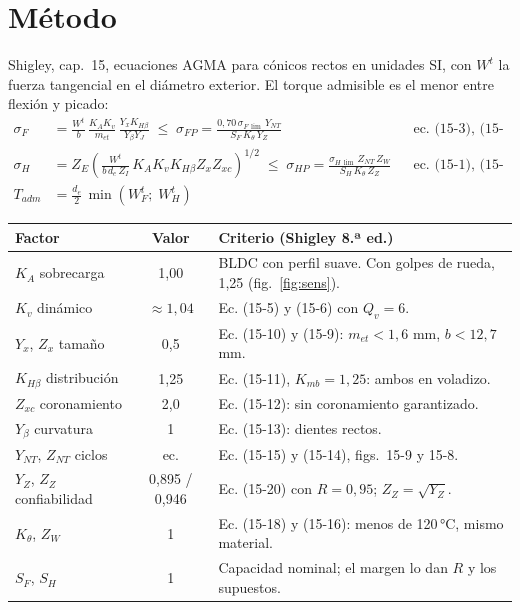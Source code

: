 \documentclass[11pt,a4paper]{article}
\begin{document}
\section{Método}\label{sec:metodo}
Shigley, cap.~15, ecuaciones AGMA para cónicos rectos en unidades SI, con $W^t$ la fuerza tangencial en el diámetro exterior.
El torque admisible es el menor entre flexión y picado:
\begin{align}
\sigma_F &= \frac{W^t}{b}\,\frac{K_A K_v}{m_{et}}\,\frac{Y_x K_{H\beta}}{Y_\beta Y_J}
  \;\le\; \sigma_{FP}=\frac{0{,}70\,\sigma_{F\,\lim}\,Y_{NT}}{S_F\,K_\theta\,Y_Z}
  && \text{ec. (15-3), (15-4)}\\
\sigma_H &= Z_E\left(\frac{W^t}{b\,d_e\,Z_I}\,K_A K_v K_{H\beta} Z_x Z_{xc}\right)^{1/2}
  \;\le\; \sigma_{HP}=\frac{\sigma_{H\,\lim}\,Z_{NT}\,Z_W}{S_H\,K_\theta\,Z_Z}
  && \text{ec. (15-1), (15-2)}\\
T_{adm} &= \frac{d_e}{2}\,\min\!\left(W^t_F;\;W^t_H\right)
\end{align}

\begin{table}[H]\centering\small
\begin{tabularx}{\linewidth}{l c X}
\toprule
Factor & Valor & Criterio (Shigley 8.ª ed.)\\\midrule
$K_A$ sobrecarga & 1,00 & BLDC con perfil suave. Con golpes de rueda, 1,25 (fig.~\ref{fig:sens}).\\
$K_v$ dinámico & $\approx1{,}04$ & Ec. (15-5) y (15-6) con $Q_v=6$.\\
$Y_x$, $Z_x$ tamaño & 0,5 & Ec. (15-10) y (15-9): $m_{et}<1{,}6$ mm, $b<12{,}7$ mm.\\
$K_{H\beta}$ distribución & 1,25 & Ec. (15-11), $K_{mb}=1{,}25$: ambos en voladizo.\\
$Z_{xc}$ coronamiento & 2,0 & Ec. (15-12): sin coronamiento garantizado.\\
$Y_\beta$ curvatura & 1 & Ec. (15-13): dientes rectos.\\
$Y_{NT}$, $Z_{NT}$ ciclos & ec. & Ec. (15-15) y (15-14), figs.~15-9 y 15-8.\\
$Y_Z$, $Z_Z$ confiabilidad & 0,895 / 0,946 & Ec. (15-20) con $R=0{,}95$; $Z_Z=\sqrt{Y_Z}$.\\
$K_\theta$, $Z_W$ & 1 & Ec. (15-18) y (15-16): menos de 120\,°C, mismo material.\\
$S_F$, $S_H$ & 1 & Capacidad nominal; el margen lo dan $R$ y los supuestos.\\
\bottomrule
\end{tabularx}
\end{table}
\end{document}
